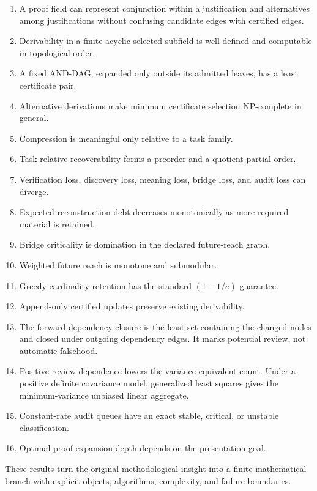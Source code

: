 \documentclass[11pt,oneside]{article}
\theoremstyle{komorebiplain}
\theoremstyle{komorebidefinition}
\theoremstyle{komorebiremark}
\begin{document}
\begin{enumerate}
\item A proof field can represent conjunction within a justification and alternatives among justifications without confusing candidate edges with certified edges.
\item Derivability in a finite acyclic selected subfield is well defined and computable in topological order.
\item A fixed AND-DAG, expanded only outside its admitted leaves, has a least certificate pair.
\item Alternative derivations make minimum certificate selection NP-complete in general.
\item Compression is meaningful only relative to a task family.
\item Task-relative recoverability forms a preorder and a quotient partial order.
\item Verification loss, discovery loss, meaning loss, bridge loss, and audit loss can diverge.
\item Expected reconstruction debt decreases monotonically as more required material is retained.
\item Bridge criticality is domination in the declared future-reach graph.
\item Weighted future reach is monotone and submodular.
\item Greedy cardinality retention has the standard $(1-1/e)$ guarantee.
\item Append-only certified updates preserve existing derivability.
\item The forward dependency closure is the least set containing the changed nodes and closed under outgoing dependency edges. It marks potential review, not automatic falsehood.
\item Positive review dependence lowers the variance-equivalent count. Under a positive definite covariance model, generalized least squares gives the minimum-variance unbiased linear aggregate.
\item Constant-rate audit queues have an exact stable, critical, or unstable classification.
\item Optimal proof expansion depth depends on the presentation goal.
\end{enumerate}

These results turn the original methodological insight into a finite mathematical branch with explicit objects, algorithms, complexity, and failure boundaries.
\end{document}
